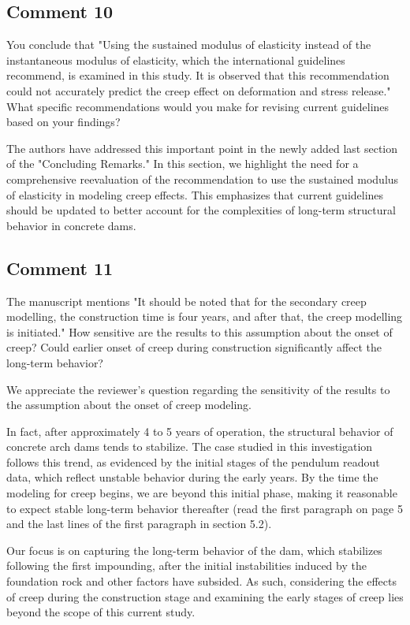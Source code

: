 \documentclass{ar2rc}
\begin{document}
	\subsection{Comment 10}
	\RC You conclude that "Using the sustained modulus of elasticity instead of the instantaneous modulus of elasticity, which	the international guidelines recommend, is examined in this study. It is observed that this recommendation could not accurately predict the creep effect on deformation and stress release." What specific recommendations would you make for revising current guidelines based on your findings?
		
	\AR The authors have addressed this important point in the newly added last section of the "Concluding Remarks." In this section, we highlight the need for a comprehensive reevaluation of the recommendation to use the sustained modulus of elasticity in modeling creep effects. This emphasizes that current guidelines should be updated to better account for the complexities of long-term structural behavior in concrete dams.
		
	\subsection{Comment 11}
	\RC The manuscript mentions "It should be noted that for the secondary creep modelling, the construction time is four years, and after that, the creep modelling is initiated." How sensitive are the results to this assumption about the onset of creep? Could earlier onset of creep during construction significantly affect the long-term behavior?
	
	\AR We appreciate the reviewer’s question regarding the sensitivity of the results to the assumption about the onset of creep modeling.
	
	In fact, after approximately 4 to 5 years of operation, the structural behavior of concrete arch dams tends to stabilize. The case studied in this investigation follows this trend, as evidenced by the initial stages of the pendulum readout data, which reflect unstable behavior during the early years. By the time the modeling for creep begins, we are beyond this initial phase, making it reasonable to expect stable long-term behavior thereafter (read the first paragraph on page 5 and the last lines of the first paragraph in section 5.2).
	
	Our focus is on capturing the long-term behavior of the dam, which stabilizes following the first impounding, after the initial instabilities induced by the foundation rock and other factors have subsided. As such, considering the effects of creep during the construction stage and examining the early stages of creep lies beyond the scope of this current study.
	
\end{document}
